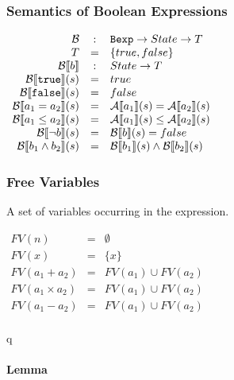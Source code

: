 \subsubsection{Semantics of Boolean Expressions}

\begin{math}
  \begin{array}{rcl}
    \mathcal{B} & : & \mathtt{Bexp} \to State \to {T} \\
    {T} & = & \{ {true}, {false} \} \\
    \mathcal{B} \llbracket  b  \rrbracket & : & State \to {T} \\
    \mathcal{B} \llbracket  \mathtt{true}  \rrbracket (s) & = & {true} \\
    \mathcal{B} \llbracket  \mathtt{false}  \rrbracket (s) & = & {false} \\
    \mathcal{B} \llbracket  a_1 = a_2  \rrbracket (s) & = & \mathcal{A} \llbracket  a_1  \rrbracket (s) = \mathcal{A} \llbracket  a_2  \rrbracket (s) \\
    \mathcal{B} \llbracket  a_1 \leq a_2  \rrbracket (s) & = & \mathcal{A} \llbracket  a_1  \rrbracket (s) \leq \mathcal{A} \llbracket  a_2  \rrbracket (s) \\
    \mathcal{B} \llbracket  \neg b  \rrbracket (s) & = & \mathcal{B} \llbracket  b  \rrbracket (s) = {false} \\
    \mathcal{B} \llbracket  b_1 \land b_2  \rrbracket (s) & = & \mathcal{B} \llbracket  b_1  \rrbracket (s) \wedge \mathcal{B} \llbracket  b_2  \rrbracket (s) \\
  \end{array}
\end{math}

\subsubsection{Free Variables}

A set of variables occurring in the expression.

\begin{math}
  \begin{array}{rcl}
    FV(n) & = & \emptyset \\
    FV(x) & = & \{ x \} \\
    FV(a_1 + a_2) & = & FV(a_1) \cup FV(a_2) \\
    FV(a_1 \times a_2) & = & FV(a_1) \cup FV(a_2) \\
    FV(a_1 - a_2) & = & FV(a_1) \cup FV(a_2) \\
  \end{array}
\end{math}

q\paragraph{Lemma}


